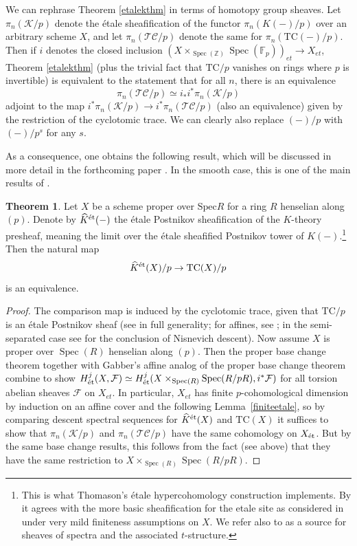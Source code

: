 \documentclass{amsart}
\newcommand{\spec}{\mathrm{Spec}}
\theoremstyle{definition}
\newtheorem{theorem}[definition]{Theorem}
\newcommand{\sub}[1]{{\mbox{\rm \scriptsize #1}}}
\renewcommand{\hat}{\widehat}
\DeclareMathOperator{\Spec}{Spec}
\newcommand{\TC}{\mathrm{TC}}
\begin{document}
We can rephrase Theorem \ref{etalekthm} in terms of homotopy group sheaves.  Let
$\pi_n(\mathcal{K}/p)$ denote the \'etale sheafification of the functor $\pi_n
(K(-)/p)$ over an arbitrary scheme $X$, and let $\pi_n( \mathcal{TC}/p)$ denote the same for $\pi_n (\TC(-)/p)$.  Then if $i$ denotes the closed inclusion $(X\times_{\Spec(\mathbb{Z})}\Spec(\mathbb{F}_p))_{et}\rightarrow X_{et}$, Theorem \ref{etalekthm} (plus the trivial fact that $\TC /p$ vanishes on rings where $p$ is invertible) is equivalent to the statement that for all $n$, there is an equivalence
\begin{equation} \label{stalkK}\pi_n(\mathcal{TC}/p)\simeq i_\ast i^\ast
\pi_n(\mathcal{K}/p)\end{equation}
adjoint to the map $i^\ast\pi_n(\mathcal{K}/p)\rightarrow i^\ast \pi_n(\mathcal{TC}/p)$ (also an equivalence) given by the restriction of the cyclotomic trace.  We can clearly also replace $(-)/p$ with $(-)/p^s$ for any $s$.

As a consequence, one obtains the following result, which will be discussed in more
detail in the forthcoming paper \cite{CM18}.
In the smooth case, this is one of the main results of \cite{GH}. 

\begin{theorem} 
\label{padicetaleKthy}
Let $X$ be a scheme proper over  $\spec R$ for a ring $R$ henselian along
$(p)$. Denote by
$\hat{K}^\sub{\'et}(-)$ the \'etale Postnikov sheafification of the $K$-theory presheaf,
meaning the limit over the \'etale sheafified Postnikov tower of
$K(-)$.\footnote{This is what Thomason's \'etale hypercohomology construction
implements. By \cite[Thm.~1.3]{CM18} it agrees with the more basic sheafification for the etale site as considered in \cite{HTT} under very mild finiteness assumptions on $X$.  We refer also to \cite[Sec.~1.3]{SAG} as a source for
sheaves of spectra and the associated $t$-structure.}  Then the natural map
$$\hat{K}^\sub{\'et}(X)/p\rightarrow \TC(X)/p$$
is an equivalence.
 \end{theorem} 
\begin{proof} The comparison map is induced by the cyclotomic trace, given that $\TC/p$ is an \'etale Postnikov sheaf (see \cite[Thm 5.16]{CM18} in full generality; for
affines, see \cite[Sec.~3]{GH}; in the semi-separated case see \cite{BMloc} for
the conclusion of Nisnevich descent).  Now assume $X$ is proper over $\Spec(R)$
henselian along $(p)$. Then the proper base change theorem together with
Gabber's affine analog of the proper base change theorem
\cite{Gabberaffine} combine to show $H^j_\sub{\'et}(X, \mathcal{F})\simeq
H^j_\sub{\'et}(X\times_{\Spec(R)}\Spec(R/pR), i^*\mathcal{F})$
for all torsion abelian sheaves $\mathcal{F}$ on $X_{et}$.  In particular,
$X_{et}$ has finite $p$-cohomological dimension by induction on an affine cover and the following Lemma~\ref{finiteetale}, so by comparing descent spectral sequences for $\hat{K}^\sub{\'et}(X)$ and $\TC(X)$ it suffices to show that $\pi_n(\mathcal{K}/p)$ and $\pi_n(\mathcal{TC}/p)$ have the same cohomology on $X_\sub{\'et}$.  But by the same base change results, this follows from the fact (see above) that they have the same restriction to $X\times_{\Spec(R)}\Spec(R/pR)$.\end{proof} 
\end{document}
